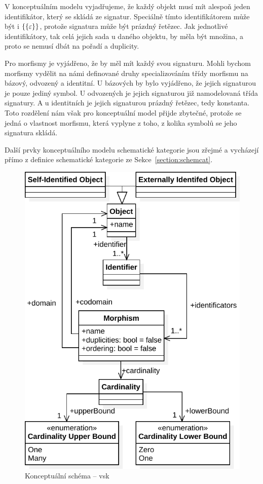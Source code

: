 V konceptuálním modelu vyjadřujeme, že každý objekt musí mít alespoň jeden identifikátor, který se skládá ze signatur.
Speciálně tímto identifikátorem může být i $\left\{\left\{\varepsilon\right\}\right\}$, protože signatura může být prázdný řetězec.
Jak jednotlivé identifikátory, tak celá jejich sada u daného objektu, by měla být množina, a proto se nemusí dbát na pořadí a duplicity.

Pro morfismy je vyjádřeno, že by měl mít každý svou signaturu.
Mohli bychom morfismy vydělit na námi definované druhy specializováním třídy morfismu na bázový, odvozený a identitní.
U bázových by bylo vyjádřeno, že jejich signaturou je pouze jediný symbol.
U odvozených je jejich signaturou již namodelovaná třída signatury.
A u identitních je jejich signaturou prázdný řetězec, tedy konstanta.
Toto rozdělení nám však pro konceptuální model přijde zbytečné, protože se jedná o vlastnost morfismu, která vyplyne z toho, z kolika symbolů se jeho signatura skládá.

Další prvky konceptuálního modelu schematické kategorie jsou zřejmé a vycházejí přímo z definice schematické kategorie ze Sekce~\ref{section:schemcat}.

\begin{figure}[!htb]
  \centering
  \includegraphics[width=\maxwidth{\textwidth}]{../img/diagrams/scv-model.pdf}
  \caption{Konceptuální schéma -- \acrlong{vsk}}
  \label{fig:class-diagram:scv}
\end{figure}

